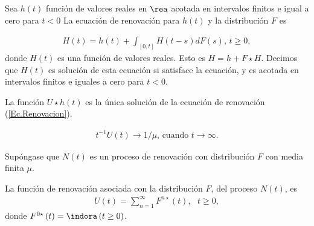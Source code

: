 %
%


\begin{Def}
Sea $h\left(t\right)$ funci\'on de valores reales en $\rea$ acotada en intervalos finitos e igual a cero para $t<0$ La ecuaci\'on de renovaci\'on para $h\left(t\right)$ y la distribuci\'on $F$ es

\begin{eqnarray}\label{Ec.Renovacion}
H\left(t\right)=h\left(t\right)+\int_{\left[0,t\right]}H\left(t-s\right)dF\left(s\right)\textrm{,    }t\geq0,
\end{eqnarray}
donde $H\left(t\right)$ es una funci\'on de valores reales. Esto es $H=h+F\star H$. Decimos que $H\left(t\right)$ es soluci\'on de esta ecuaci\'on si satisface la ecuaci\'on, y es acotada en intervalos finitos e iguales a cero para $t<0$.
\end{Def}

\begin{Prop}
La funci\'on $U\star h\left(t\right)$ es la \'unica soluci\'on de la ecuaci\'on de renovaci\'on (\ref{Ec.Renovacion}).
\end{Prop}

\begin{Teo}
\begin{eqnarray*}
t^{-1}U\left(t\right)\rightarrow 1/\mu\textrm{,    cuando }t\rightarrow\infty.
\end{eqnarray*}
\end{Teo}

%
%


Sup\'ongase que $N\left(t\right)$ es un proceso de renovaci\'on con distribuci\'on $F$ con media finita $\mu$.

\begin{Def}
La funci\'on de renovaci\'on asociada con la distribuci\'on $F$, del proceso $N\left(t\right)$, es
\begin{eqnarray*}
U\left(t\right)=\sum_{n=1}^{\infty}F^{n\star}\left(t\right),\textrm{   }t\geq0,
\end{eqnarray*}
donde $F^{0\star}\left(t\right)=\indora\left(t\geq0\right)$.
\end{Def}


